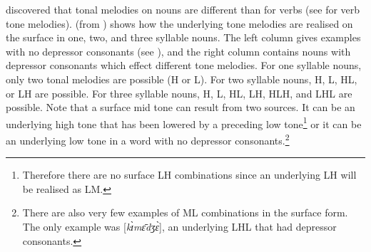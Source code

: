 \citet{Bow1997c} discovered that tonal melodies on nouns are different than for verbs (see  for verb tone melodies).  (from \citealt{Bow1997c}) shows how the underlying tone melodies are realised on the surface in one, two, and three syllable nouns.  The left column gives examples with no depressor consonants (see ), and the right column contains nouns with depressor consonants which effect different tone melodies. For one syllable nouns, only two tonal melodies are possible (H or L). For two syllable nouns, H, L, HL, or LH are possible. For three syllable nouns, H, L, HL, LH, HLH, and LHL are possible. Note that a surface mid tone can result from two sources. It can be an underlying high tone that has been lowered by a preceding low tone\footnote{Therefore there are no surface LH combinations since an underlying LH will be realised as LM.} or it can be an underlying low tone in a word with no depressor consonants.\footnote{There are also very few examples of ML combinations in the surface form. The only example was [\textit{k\`{ɪ}m\={ɛ}dʒ\`{ɛ}}], an underlying LHL that had depressor consonants.} 

